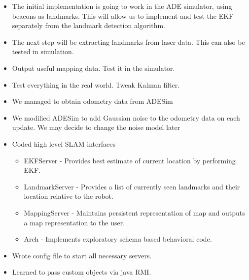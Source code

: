 \documentclass[12pt]{article}
\begin{document}
\begin{itemize}
    \setlength{\itemsep}{0pt}
    \setlength{\parskip}{0pt}
    \setlength{\parsep}{0pt}
    \item The initial implementation is going to work in the ADE simulator,
          using beacons as landmarks. This will allow us to implement and test
          the EKF separately from the landmark detection algorithm.
    \item The next step will be extracting landmarks from laser data. This can
          also be tested in simulation.
    \item Output useful mapping data. Test it in the simulator.
    \item Test everything in the real world. Tweak Kalman filter.
\end{itemize}

\begin{itemize}
    \setlength{\itemsep}{0pt}
    \setlength{\parskip}{0pt}
    \setlength{\parsep}{0pt}
    \item We managed to obtain odometry data from ADESim
    \item We modified ADESim to add Gaussian noise to the odometry data on each
          update. We may decide to change the noise model later
\end{itemize}

\begin{itemize}
    \setlength{\itemsep}{0pt}
    \setlength{\parskip}{0pt}
    \setlength{\parsep}{0pt}
  \item Coded high level SLAM interfaces
      \begin{itemize}
          \item EKFServer - Provides best estimate of current location by
            performing EKF.
          \item LandmarkServer - Provides a list of currently seen landmarks
            and their location relative to the robot.
          \item MappingServer - Maintains persistent representation of map and
            outputs a map representation to the user.
          \item Arch - Implements exploratory schema based behavioral code.
      \end{itemize}
    \item Wrote config file to start all necessary servers.
    \item Learned to pass custom objects via java RMI.
\end{itemize}
\end{document}
